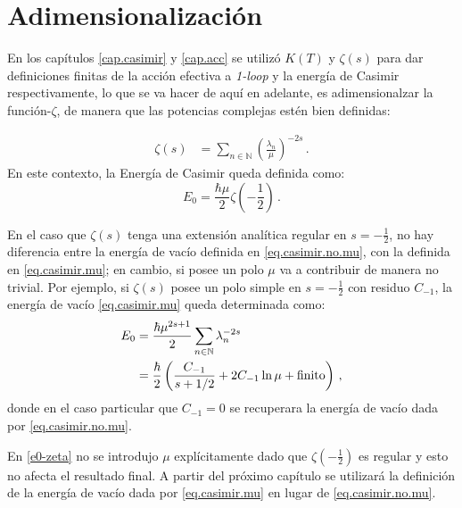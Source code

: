 \bigskip

\section{Adimensionalización}\label{seq.adim}

\medskip

En los capítulos \ref{cap.casimir} y \ref{cap.acc} se utilizó $K(T)$ y $\zeta (s)$ para dar definiciones finitas de la acción efectiva a {\it 1-loop} y la energía de Casimir respectivamente, lo que se va hacer de aquí en adelante, es adimensionalzar la función-$\zeta$, de manera que las potencias complejas estén bien definidas:

\begin{align}
\zeta  (s) &= \sum\limits_{n \in \mathbb N} \left( \frac{\lambda  _n}{\mu }  \right) ^{-2s } \label{def.adim} \, .
\end{align}
En este contexto, la Energía de Casimir queda definida como:
\begin{equation}
E _0 = \frac{\hbar \mu}{2} \zeta  \left( - \frac{1}{2} \right) \,.
\label{eq.casimir.mu}
\end{equation}

En el caso que $\zeta (s)$ tenga una extensión analítica regular en $s=-\frac{1}{2}$, no hay diferencia entre la energía de vacío definida en \eqref{eq.casimir.no.mu}, con la definida en \eqref{eq.casimir.mu}; en cambio, si posee un polo $\mu$ va a contribuir de manera no trivial. Por ejemplo, si $\zeta (s) $ posee un polo simple en $s= - \frac{1}{2}$ con residuo $C _{-1}$, la energía de vacío  \eqref{eq.casimir.mu} queda determinada como:
\begin{equation}
\begin{aligned}
E _0 &= 
\frac{\hbar \mu ^{2s+1}}{2} 
\sum\limits_{n \in \mathbb N}  \lambda _n   ^{-2s } \\ &= 
\frac{\hbar }{2} 
\left(
		\frac{C _{-1}}{  s+1/2 } + 2 C _{-1} \ln \mu + {\rm finito} 
		\right) 
\, ,
\end{aligned}
\end{equation}
donde en el caso particular que  $C _{-1} = 0 $ se recuperara la energía de vacío dada por \eqref{eq.casimir.no.mu}.


En \eqref{e0-zeta} no se introdujo $\mu$ explícitamente dado que $\zeta \left(- \frac{1}{2} \right)$ es regular y esto no afecta el resultado final. A partir del próximo capítulo se utilizará la definición de la energía de vacío dada por \eqref{eq.casimir.mu} en lugar de \eqref{eq.casimir.no.mu}.


